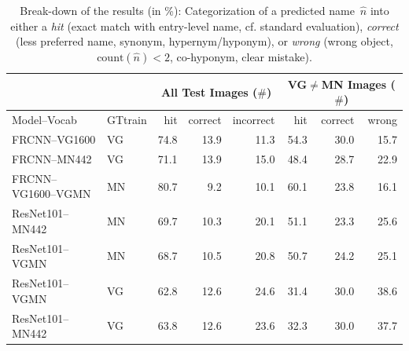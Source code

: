 \begin{table}[t]
	\centering
	\small
	\begin{tabular}{l|l|r@{~}r@{~}r@{~}||r@{~}r@{~}r@{~}}
		\toprule
		& & \multicolumn{3}{c}{All Test Images ($\#$)} 
		& \multicolumn{3}{c}{VG$\neq$MN Images ($\#$)}\\
	\toprule
	Model--Vocab	& GTtrain  
	&  hit &  correct &  incorrect &  hit &  correct &  wrong \\
	\midrule
	FRCNN--VG1600 & VG           &         74.8 &                  13.9 &                    11.3 &         54.3 &                  30.0 &                    15.7 \\
	FRCNN--MN442 & VG &         71.1 &                  13.9 &                    15.0 &         48.4 &                  28.7 &                    22.9 \\
	\midrule \midrule
	FRCNN--VG1600--VGMN & MN %
	 &         80.7 &                   9.2 &                    10.1 &         60.1 &                  23.8 &                    16.1 \\
	\midrule
	ResNet101--MN442 & MN %
	 &         69.7 &                  10.3 &                    20.1 &         51.1 &                  23.3 &                    25.6 \\
	ResNet101--VGMN & MN%
	 &         68.7 &                  10.5 &                    20.8 &         50.7 &                  24.2 &                    25.1 \\
	ResNet101--VGMN & VG %
	 &         62.8 &                  12.6 &                    24.6 &         31.4 &                  30.0 &                    38.6 \\
	ResNet101--MN442 & VG %
	 &         63.8 &                  12.6 &                    23.6 &         32.3 &                  30.0 &                    37.7 \\
	\bottomrule
\end{tabular}
\caption{Break-down of the results (in \%): Categorization of a predicted name\ $\hat{n}$ into either a \textit{hit} (exact match with entry-level name, cf. standard evaluation), \textit{correct} (less preferred name, synonym, hypernym/hyponym), or \textit{wrong} (wrong object, $\text{count}(\hat{n})<2$, co-hyponym, clear mistake). \label{tab:exp_overview_results}}
\end{table}

